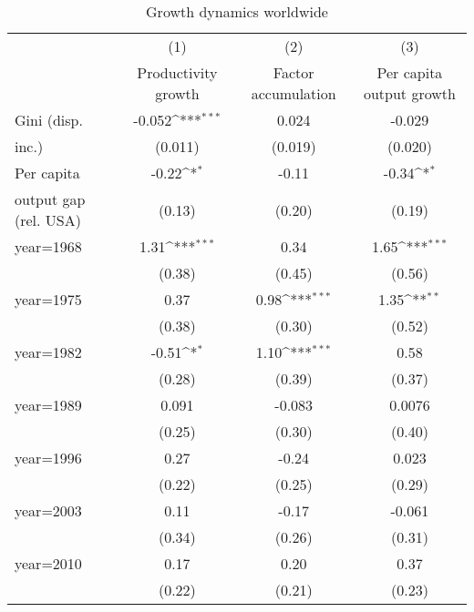 \begin{sidewaystable}[htbp]\centering
\def\sym#1{\ifmmode^{#1}\else\(^{#1}\)\fi}
\caption{Growth dynamics worldwide}
\begin{tabular}{l*{3}{c}}
\hline\hline
                &\multicolumn{1}{c}{(1)}&\multicolumn{1}{c}{(2)}&\multicolumn{1}{c}{(3)}\\
                &\multicolumn{1}{c}{Productivity growth}&\multicolumn{1}{c}{Factor accumulation}&\multicolumn{1}{c}{Per capita output growth}\\
\hline
Gini (disp.     &   -0.052\sym{***}&    0.024         &   -0.029         \\
inc.)           &  (0.011)         &  (0.019)         &  (0.020)         \\
[1em]
Per capita      &    -0.22\sym{*}  &    -0.11         &    -0.34\sym{*}  \\
output gap (rel. USA)&   (0.13)         &   (0.20)         &   (0.19)         \\
[1em]
year=1968       &     1.31\sym{***}&     0.34         &     1.65\sym{***}\\
                &   (0.38)         &   (0.45)         &   (0.56)         \\
[1em]
year=1975       &     0.37         &     0.98\sym{***}&     1.35\sym{**} \\
                &   (0.38)         &   (0.30)         &   (0.52)         \\
[1em]
year=1982       &    -0.51\sym{*}  &     1.10\sym{***}&     0.58         \\
                &   (0.28)         &   (0.39)         &   (0.37)         \\
[1em]
year=1989       &    0.091         &   -0.083         &   0.0076         \\
                &   (0.25)         &   (0.30)         &   (0.40)         \\
[1em]
year=1996       &     0.27         &    -0.24         &    0.023         \\
                &   (0.22)         &   (0.25)         &   (0.29)         \\
[1em]
year=2003       &     0.11         &    -0.17         &   -0.061         \\
                &   (0.34)         &   (0.26)         &   (0.31)         \\
[1em]
year=2010       &     0.17         &     0.20         &     0.37         \\
                &   (0.22)         &   (0.21)         &   (0.23)         \\

\end{tabular}
\end{sidewaystable}
